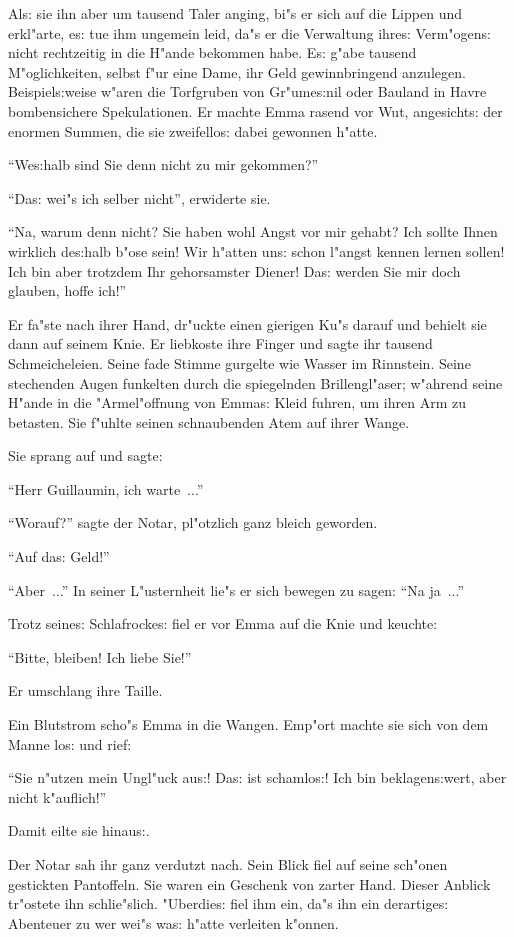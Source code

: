 \documentclass[oneside,12pt]{book}
\newcommand{\s}{s:}%
\begin{document}
Al{\s} sie ihn aber um tausend Taler anging, bi"s er sich auf die
Lippen und erkl"arte, e{\s} tue ihm ungemein leid, da"s er die
Verwaltung ihre{\s} Verm"ogen{\s} nicht rechtzeitig in die H"ande
bekommen habe. E{\s} g"abe tausend M"oglichkeiten, selbst f"ur
eine Dame, ihr Geld gewinnbringend anzulegen. Beispiel{\s}weise
w"aren die Torfgruben von Gr"ume{\s}nil oder Bauland in Havre
bombensichere Spekulationen. Er machte Emma rasend vor Wut,
angesicht{\s} der enormen Summen, die sie zweifello{\s} dabei
gewonnen h"atte.

"`We{\s}halb sind Sie denn nicht zu mir gekommen?"'

"`Da{\s} wei"s ich selber nicht"', erwiderte sie.

"`Na, warum denn nicht? Sie haben wohl Angst vor mir gehabt? Ich
sollte Ihnen wirklich de{\s}halb b"ose sein! Wir h"atten un{\s}
schon l"angst kennen lernen sollen! Ich bin aber trotzdem Ihr
gehorsamster Diener! Da{\s} werden Sie mir doch glauben, hoffe
ich!"'

Er fa"ste nach ihrer Hand, dr"uckte einen gierigen Ku"s darauf und
behielt sie dann auf seinem Knie. Er liebkoste ihre Finger und
sagte ihr tausend Schmeicheleien. Seine fade Stimme gurgelte wie
Wasser im Rinnstein. Seine stechenden Augen funkelten durch die
spiegelnden Brillengl"aser; w"ahrend seine H"ande in die
"Armel"offnung von Emma{\s} Kleid fuhren, um ihren Arm zu
betasten. Sie f"uhlte seinen schnaubenden Atem auf ihrer Wange.

Sie sprang auf und sagte:

"`Herr Guillaumin, ich warte~..."'

"`Worauf?"' sagte der Notar, pl"otzlich ganz bleich geworden.

"`Auf da{\s} Geld!"'

"`Aber~..."' In seiner L"usternheit lie"s er sich bewegen zu
sagen: "`Na ja~..."'

Trotz seine{\s} Schlafrocke{\s} fiel er vor Emma auf die Knie und
keuchte:

"`Bitte, bleiben! Ich liebe Sie!"'

Er umschlang ihre Taille.

Ein Blutstrom scho"s Emma in die Wangen. Emp"ort machte sie sich von
dem Manne lo{\s} und rief:

"`Sie n"utzen mein Ungl"uck au{\s}! Da{\s} ist schamlo{\s}! Ich
bin beklagen{\s}wert, aber nicht k"auflich!"'

Damit eilte sie hinau{\s}.

Der Notar sah ihr ganz verdutzt nach. Sein Blick fiel auf seine
sch"onen gestickten Pantoffeln. Sie waren ein Geschenk von zarter
Hand. Dieser Anblick tr"ostete ihn schlie"slich. "Uberdie{\s} fiel
ihm ein, da"s ihn ein derartige{\s} Abenteuer zu wer wei"s wa{\s}
h"atte verleiten k"onnen.
\end{document}
